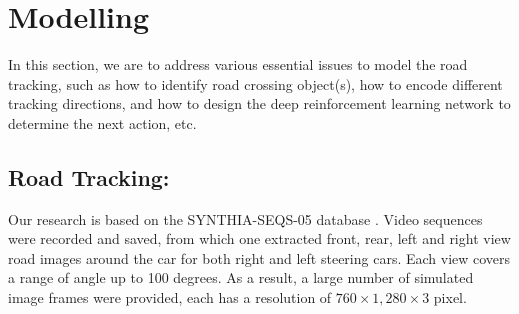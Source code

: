 \documentclass{svproc}
\begin{document}
 


\section{Modelling}
In this section, we are to address various essential issues to model the road tracking, such as how to identify road crossing object(s), how to encode different tracking directions, and how to design the deep reinforcement learning network to determine the next action, etc. 

\subsection{Road Tracking:} 
Our research is based on the SYNTHIA-SEQS-05 database \cite{Ros2016TheSYNTHIA}. Video sequences were recorded and saved, from which one extracted front,  rear, left and right view road images around the car for both right and left steering cars. Each view covers a range of angle up to 100 degrees. As a result, a large number of simulated image frames were provided, each has a resolution of $760 \times 1,280 \times 3$ pixel. 
\end{document}
